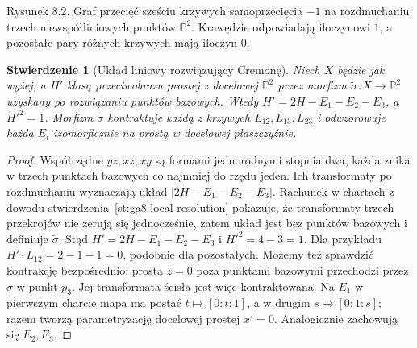 \documentclass[11pt,a4paper,openany]{report}
\numberwithin{equation}{section}
\theoremstyle{plain}
\newtheorem{stwierdzenie}[twierdzenie]{Stwierdzenie}
\theoremstyle{definition}
\theoremstyle{remark}
\newcommand{\PP}{\mathbb P}
\begin{document}
\begin{center}

{\small Rysunek 8.2. Graf przecięć sześciu krzywych
samoprzecięcia $-1$ na rozdmuchaniu trzech niewspółliniowych
punktów $\PP^2$. Krawędzie odpowiadają iloczynowi $1$,
a pozostałe pary różnych krzywych mają iloczyn $0$.}\par
\end{center}

\begin{stwierdzenie}[Układ liniowy rozwiązujący Cremonę]
\label{st:ga8-cremona-linear}
Niech $X$ będzie jak wyżej, a $H'$ klasą przeciwobrazu
prostej z docelowej $\PP^2$ przez morfizm
$\widetilde\sigma:X\to\PP^2$ uzyskany po rozwiązaniu
punktów bazowych. Wtedy
$H'=2H-E_1-E_2-E_3$, a $H'^2=1$.
Morfizm $\widetilde\sigma$ kontraktuje każdą z krzywych
$L_{12},L_{13},L_{23}$ i odwzorowuje każdą $E_i$
izomorficznie na prostą w docelowej płaszczyźnie.
\end{stwierdzenie}
\begin{proof}
Współrzędne $yz,xz,xy$ są formami jednorodnymi
stopnia dwa, każda znika w trzech punktach bazowych
co najmniej do rzędu jeden. Ich transformaty po
rozdmuchaniu wyznaczają układ $|2H-E_1-E_2-E_3|$.
Rachunek w chartach z dowodu
stwierdzenia~\ref{st:ga8-local-resolution} pokazuje,
że transformaty trzech przekrojów nie zerują się
jednocześnie, zatem układ jest bez punktów bazowych
i definiuje $\widetilde\sigma$.
Stąd $H'=2H-E_1-E_2-E_3$ i $H'^2=4-3=1$.
Dla przykładu $H'\cdot L_{12}=2-1-1=0$,
podobnie dla pozostałych. Możemy też sprawdzić
kontrakcję bezpośrednio: prosta $z=0$ poza punktami
bazowymi przechodzi przez $\sigma$ w punkt $p_3$.
Jej transformata ścisła jest więc kontraktowana.
Na $E_1$ w pierwszym charcie mapa ma postać
$t\mapsto[0:t:1]$, a w drugim $s\mapsto[0:1:s]$;
razem tworzą parametryzację docelowej prostej $x'=0$.
Analogicznie zachowują się $E_2,E_3$.
\end{proof}
\end{document}
